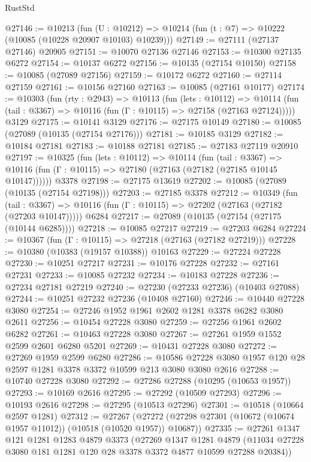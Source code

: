 \begin{lexlean}{RustStd}
\begin{coremodule}
@27146 := @10213
    (fun (U : @10212) => @10214 (fun (t : @7) => @10222 (@10085 (@10228 @20907 @10103) @10239)))
@27149 := @27111 (@27137 @27146) @20905
@27151 := @10070 @27136 @27146
@27153 := @10300 @27135 @6272
@27154 := @10137 @6272
@27156 := @10135 (@27154 @10150)
@27158 := @10085 (@27089 @27156)
@27159 := @10172 @6272
@27160 := @27114 @27159
@27161 := @10156 @27160
@27163 := @10085 (@27161 @10177)
@27174 := @10303
    (fun (rty : @2943) =>
    @10113
      (fun (lets : @10112) =>
      @10114 (fun (tail : @3367) => @10116 (fun (Γ : @10115) => @27158 (@27163 @27124)))))
    @3129
@27175 := @10141 @3129
@27176 := @27175 @10149
@27180 := @10085 (@27089 (@10135 (@27154 @27176)))
@27181 := @10185 @3129
@27182 := @10184 @27181
@27183 := @10188 @27181
@27185 := @27183 @27119 @20910
@27197 := @10325
    (fun (lets : @10112) =>
    @10114
      (fun (tail : @3367) =>
      @10116 (fun (Γ : @10115) => @27180 (@27163 (@27182 (@27185 @10145 @10147))))))
    @3378
@27198 := @27175 @13619
@27202 := @10085 (@27089 (@10135 (@27154 @27198)))
@27203 := @27185 @3378
@27212 := @10349
    (fun (tail : @3367) => @10116 (fun (Γ : @10115) => @27202 (@27163 (@27182 (@27203 @10147)))))
    @6284
@27217 := @27089 (@10135 (@27154 (@27175 (@10144 @6285))))
@27218 := @10085 @27217
@27219 := @27203 @6284
@27224 := @10367 (fun (Γ : @10115) => @27218 (@27163 (@27182 @27219)))
@27228 := @10380 (@10383 (@19157 @10388)) @10163
@27229 := @27224 @27228
@27230 := @10251 @27217
@27231 := @10176 @27228
@27232 := @27161 @27231
@27233 := @10085 @27232
@27234 := @10183 @27228
@27236 := @27234 @27181 @27219
@27240 := @27230 (@27233 @27236) (@10403 @27088)
@27244 := @10251 @27232 @27236 (@10408 @27160)
@27246 := @10440 @27228 @3080
@27254 := @27246 @1952 @1961 @2602 @1281 @3378 @6282 @3080 @2611
@27256 := @10454 @27228 @3080
@27259 := @27256 @1961 @2602 @6282
@27261 := @10463 @27228 @3080
@27267 := @27261 @1959 @1552 @2599 @2601 @6280 @5201
@27269 := @10431 @27228 @3080
@27272 := @27269 @1959 @2599 @6280
@27286 := @10586 @27228 @3080 @1957 @120 @28 @2597 @1281 @3378 @3372 @10599 @213 @3080 @3080 @2616
@27288 := @10740 @27228 @3080
@27292 := @27286 @27288 (@10295 (@10653 @1957))
@27293 := @10169 @2616
@27295 := @27292 (@10509 @27293)
@27296 := @10193 @2616
@27298 := @27295 (@10513 @27296)
@27301 := @10518 (@10664 @2597 @1281)
@27312 := @27267
    (@27272 (@27298 @27301 (@10672 (@10674 @1957 @11012)) (@10518 (@10520 @1957)) @10687))
@27335 := @27261
    @1347
    @121
    @1281
    @1283
    @4879
    @3373
    (@27269
      @1347
      @1281
      @4879
      (@11034 @27228 @3080 @181 @1281 @120 @28 @3378 @3372 @4877 @10599 @27288 @20384))

\end{coremodule}
\end{lexlean}
